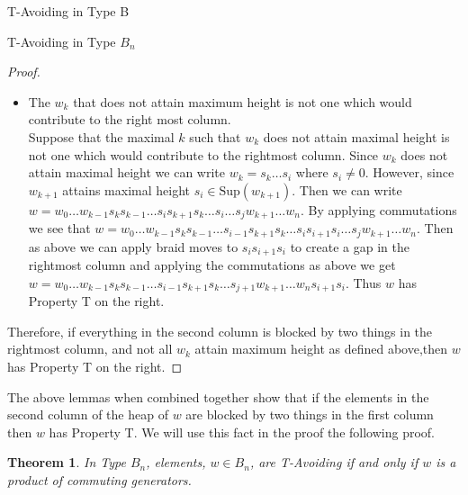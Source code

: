 \documentclass[11pt]{amsart}
\newtheorem{theorem}{Theorem}[subsection]
\theoremstyle{definition}
\numberwithin{equation}{section}
\renewcommand{\(}{\left(}
\renewcommand{\)}{\right)}
\newcommand{\Sup}{\textrm{Sup}}
\begin{document}
\begin{section}{T-Avoiding in Type B}
\begin{subsection}{T-Avoiding in Type $B_n$}
\begin{proof}
\begin{itemize}
	\item The $w_k$ that does not attain maximum height is not one which would contribute to the right most column.\\
		Suppose that the maximal $k$ such that $w_k$ does not attain maximal height is not one which would contribute to the rightmost column. Since $w_k$ does not attain maximal height we can write $w_k=s_k \ldots s_i$ where $s_i \neq 0$. However, since $w_{k+1}$ attains maximal height $s_i \in \Sup(w_{k+1})$. Then we can write $w=w_0 \ldots w_{k-1} s_k s_{k-1} \ldots s_i s_{k+1} s_k \ldots s_i \ldots s_j w_{k+1} \ldots w_n$. By applying commutations we see that  $w=w_0 \ldots w_{k-1} s_k s_{k-1} \ldots s_{i-1} s_{k+1} s_k \ldots s_i s_{i+1} s_i \ldots s_j w_{k+1} \ldots w_n$. Then as above we can apply braid moves to $s_i s_{i+1} s_i$ to create a gap in the rightmost column and applying the commutations as above we get $w=w_0 \ldots w_{k-1} s_k s_{k-1} \ldots s_{i-1} s_{k+1} s_k \ldots s_{j+1} w_{k+1} \ldots w_n s_{i+1} s_{i}$. Thus $w$ has Property T on the right.
	\end{itemize}
Therefore, if everything in the second column is blocked by two things in the rightmost column, and not all $w_k$ attain maximum height as defined above,then $w$ has Property T on the right.
\end{proof}

The above lemmas when combined together show that if the elements in the second column of the heap of $w$ are blocked by two things in the first column then $w$ has Property T. We will use this fact in the proof the following proof.

\begin{theorem}
	In Type $B_n$, elements, $w \in B_n$, are T-Avoiding if and only if $w$ is a product of commuting generators.
\end{theorem}


\end{subsection}
\end{section}
\end{document}
